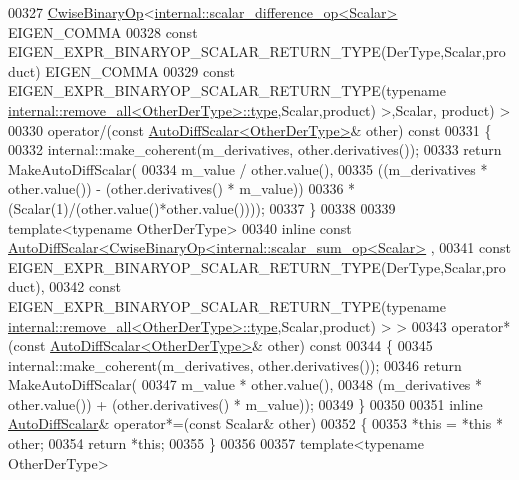 \begin{DoxyCode}
00327         \hyperlink{group___core___module_class_eigen_1_1_cwise_binary_op}{CwiseBinaryOp}<\hyperlink{struct_eigen_1_1internal_1_1scalar__difference__op}{internal::scalar\_difference\_op<Scalar>}
       EIGEN\_COMMA
00328           \textcolor{keyword}{const} EIGEN\_EXPR\_BINARYOP\_SCALAR\_RETURN\_TYPE(DerType,Scalar,product) EIGEN\_COMMA
00329           \textcolor{keyword}{const} EIGEN\_EXPR\_BINARYOP\_SCALAR\_RETURN\_TYPE(\textcolor{keyword}{typename} 
      \hyperlink{group___sparse_core___module}{internal::remove\_all<OtherDerType>::type},Scalar,product) >,Scalar,
      product) >
00330     operator/(\textcolor{keyword}{const} \hyperlink{class_eigen_1_1_auto_diff_scalar}{AutoDiffScalar<OtherDerType>}& other)\textcolor{keyword}{ const}
00331 \textcolor{keyword}{    }\{
00332       internal::make\_coherent(m\_derivatives, other.derivatives());
00333       \textcolor{keywordflow}{return} MakeAutoDiffScalar(
00334         m\_value / other.value(),
00335           ((m\_derivatives * other.value()) - (other.derivatives() * m\_value))
00336         * (Scalar(1)/(other.value()*other.value())));
00337     \}
00338 
00339     \textcolor{keyword}{template}<\textcolor{keyword}{typename} OtherDerType>
00340     \textcolor{keyword}{inline} \textcolor{keyword}{const} \hyperlink{class_eigen_1_1_auto_diff_scalar}{AutoDiffScalar<CwiseBinaryOp<internal::scalar\_sum\_op<Scalar>}
      ,
00341         \textcolor{keyword}{const} EIGEN\_EXPR\_BINARYOP\_SCALAR\_RETURN\_TYPE(DerType,Scalar,product),
00342         \textcolor{keyword}{const} EIGEN\_EXPR\_BINARYOP\_SCALAR\_RETURN\_TYPE(\textcolor{keyword}{typename} 
      \hyperlink{group___sparse_core___module}{internal::remove\_all<OtherDerType>::type},Scalar,product) > >
00343     operator*(\textcolor{keyword}{const} \hyperlink{class_eigen_1_1_auto_diff_scalar}{AutoDiffScalar<OtherDerType>}& other)\textcolor{keyword}{ const}
00344 \textcolor{keyword}{    }\{
00345       internal::make\_coherent(m\_derivatives, other.derivatives());
00346       \textcolor{keywordflow}{return} MakeAutoDiffScalar(
00347         m\_value * other.value(),
00348         (m\_derivatives * other.value()) + (other.derivatives() * m\_value));
00349     \}
00350 
00351     \textcolor{keyword}{inline} \hyperlink{class_eigen_1_1_auto_diff_scalar}{AutoDiffScalar}& operator*=(\textcolor{keyword}{const} Scalar& other)
00352     \{
00353       *\textcolor{keyword}{this} = *\textcolor{keyword}{this} * other;
00354       \textcolor{keywordflow}{return} *\textcolor{keyword}{this};
00355     \}
00356 
00357     \textcolor{keyword}{template}<\textcolor{keyword}{typename} OtherDerType>

\end{DoxyCode}
